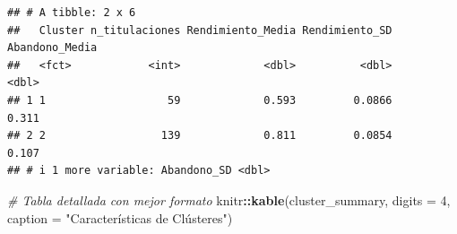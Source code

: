 \documentclass[
]{article}
\newenvironment{Shaded}{\begin{snugshade}}{\end{snugshade}}
\newcommand{\AttributeTok}[1]{\textcolor[rgb]{0.13,0.29,0.53}{#1}}
\newcommand{\CommentTok}[1]{\textcolor[rgb]{0.56,0.35,0.01}{\textit{#1}}}
\newcommand{\DecValTok}[1]{\textcolor[rgb]{0.00,0.00,0.81}{#1}}
\newcommand{\FunctionTok}[1]{\textcolor[rgb]{0.13,0.29,0.53}{\textbf{#1}}}
\newcommand{\NormalTok}[1]{#1}
\newcommand{\SpecialCharTok}[1]{\textcolor[rgb]{0.81,0.36,0.00}{\textbf{#1}}}
\newcommand{\StringTok}[1]{\textcolor[rgb]{0.31,0.60,0.02}{#1}}
\begin{document}
\begin{verbatim}
## # A tibble: 2 x 6
##   Cluster n_titulaciones Rendimiento_Media Rendimiento_SD Abandono_Media
##   <fct>            <int>             <dbl>          <dbl>          <dbl>
## 1 1                   59             0.593         0.0866          0.311
## 2 2                  139             0.811         0.0854          0.107
## # i 1 more variable: Abandono_SD <dbl>
\end{verbatim}

\begin{Shaded}
\begin{Highlighting}[]
\CommentTok{\# Tabla detallada con mejor formato}
\NormalTok{knitr}\SpecialCharTok{::}\FunctionTok{kable}\NormalTok{(cluster\_summary, }\AttributeTok{digits =} \DecValTok{4}\NormalTok{, }\AttributeTok{caption =} \StringTok{"Características de Clústeres"}\NormalTok{)}
\end{Highlighting}
\end{Shaded}
\end{document}
